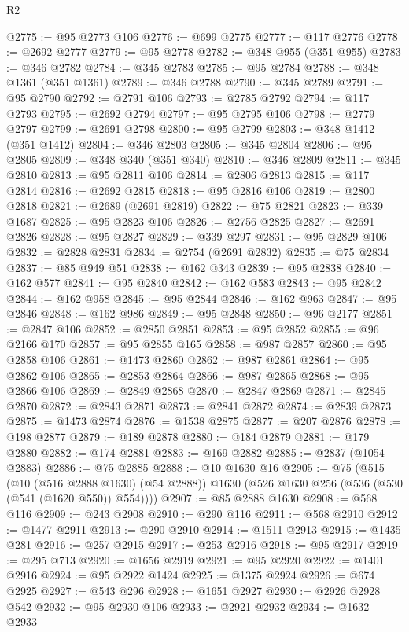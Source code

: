 \begin{lexlean}{R2}
\begin{coremodule}
@2775 := @95 @2773 @106
@2776 := @699 @2775
@2777 := @117 @2776
@2778 := @2692 @2777
@2779 := @95 @2778
@2782 := @348 @955 (@351 @955)
@2783 := @346 @2782
@2784 := @345 @2783
@2785 := @95 @2784
@2788 := @348 @1361 (@351 @1361)
@2789 := @346 @2788
@2790 := @345 @2789
@2791 := @95 @2790
@2792 := @2791 @106
@2793 := @2785 @2792
@2794 := @117 @2793
@2795 := @2692 @2794
@2797 := @95 @2795 @106
@2798 := @2779 @2797
@2799 := @2691 @2798
@2800 := @95 @2799
@2803 := @348 @1412 (@351 @1412)
@2804 := @346 @2803
@2805 := @345 @2804
@2806 := @95 @2805
@2809 := @348 @340 (@351 @340)
@2810 := @346 @2809
@2811 := @345 @2810
@2813 := @95 @2811 @106
@2814 := @2806 @2813
@2815 := @117 @2814
@2816 := @2692 @2815
@2818 := @95 @2816 @106
@2819 := @2800 @2818
@2821 := @2689 (@2691 @2819)
@2822 := @75 @2821
@2823 := @339 @1687
@2825 := @95 @2823 @106
@2826 := @2756 @2825
@2827 := @2691 @2826
@2828 := @95 @2827
@2829 := @339 @297
@2831 := @95 @2829 @106
@2832 := @2828 @2831
@2834 := @2754 (@2691 @2832)
@2835 := @75 @2834
@2837 := @85 @949 @51
@2838 := @162 @343
@2839 := @95 @2838
@2840 := @162 @577
@2841 := @95 @2840
@2842 := @162 @583
@2843 := @95 @2842
@2844 := @162 @958
@2845 := @95 @2844
@2846 := @162 @963
@2847 := @95 @2846
@2848 := @162 @986
@2849 := @95 @2848
@2850 := @96 @2177
@2851 := @2847 @106
@2852 := @2850 @2851
@2853 := @95 @2852
@2855 := @96 @2166 @170
@2857 := @95 @2855 @165
@2858 := @987 @2857
@2860 := @95 @2858 @106
@2861 := @1473 @2860
@2862 := @987 @2861
@2864 := @95 @2862 @106
@2865 := @2853 @2864
@2866 := @987 @2865
@2868 := @95 @2866 @106
@2869 := @2849 @2868
@2870 := @2847 @2869
@2871 := @2845 @2870
@2872 := @2843 @2871
@2873 := @2841 @2872
@2874 := @2839 @2873
@2875 := @1473 @2874
@2876 := @1538 @2875
@2877 := @207 @2876
@2878 := @198 @2877
@2879 := @189 @2878
@2880 := @184 @2879
@2881 := @179 @2880
@2882 := @174 @2881
@2883 := @169 @2882
@2885 := @2837 (@1054 @2883)
@2886 := @75 @2885
@2888 := @10 @1630 @16
@2905 := @75
    (@515
      (@10 (@516 @2888 @1630) (@54 @2888))
      @1630
      (@526 @1630 @256 (@536 (@530 (@541 (@1620 @550)) @554))))
@2907 := @85 @2888 @1630
@2908 := @568 @116
@2909 := @243 @2908
@2910 := @290 @116
@2911 := @568 @2910
@2912 := @1477 @2911
@2913 := @290 @2910
@2914 := @1511 @2913
@2915 := @1435 @281
@2916 := @257 @2915
@2917 := @253 @2916
@2918 := @95 @2917
@2919 := @295 @713
@2920 := @1656 @2919
@2921 := @95 @2920
@2922 := @1401 @2916
@2924 := @95 @2922 @1424
@2925 := @1375 @2924
@2926 := @674 @2925
@2927 := @543 @296
@2928 := @1651 @2927
@2930 := @2926 @2928 @542
@2932 := @95 @2930 @106
@2933 := @2921 @2932
@2934 := @1632 @2933

\end{coremodule}
\end{lexlean}
